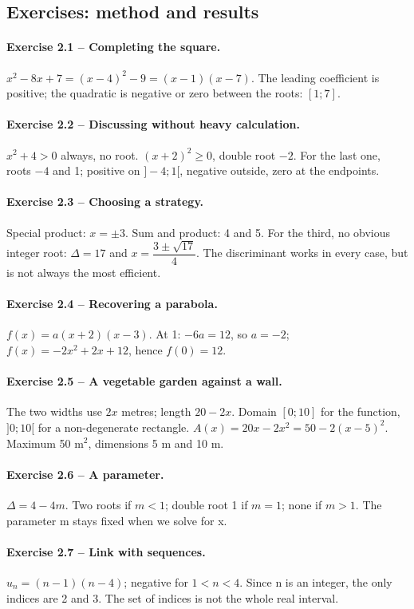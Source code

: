 \subsection*{Exercises: method and results}
\paragraph{Exercise 2.1 -- Completing the square.} $x^2-8x+7=(x-4)^2-9=(x-1)(x-7)$. The leading coefficient is positive; the quadratic is negative or zero between the roots: $[1;7]$.
\paragraph{Exercise 2.2 -- Discussing without heavy calculation.} $x^2+4>0$ always, no root. $(x+2)^2\geq0$, double root $-2$. For the last one, roots $-4$ and 1; positive on $]-4;1[$, negative outside, zero at the endpoints.
\paragraph{Exercise 2.3 -- Choosing a strategy.} Special product: $x=\pm3$. Sum and product: 4 and 5. For the third, no obvious integer root: $\Delta=17$ and $x=\dfrac{3\pm\sqrt{17}}{4}$. The discriminant works in every case, but is not always the most efficient.
\paragraph{Exercise 2.4 -- Recovering a parabola.} $f(x)=a(x+2)(x-3)$. At 1: $-6a=12$, so $a=-2$; $f(x)=-2x^2+2x+12$, hence $f(0)=12$.
\paragraph{Exercise 2.5 -- A vegetable garden against a wall.} The two widths use $2x$ metres; length $20-2x$. Domain $[0;10]$ for the function, $]0;10[$ for a non-degenerate rectangle. $A(x)=20x-2x^2=50-2(x-5)^2$. Maximum 50 m$^2$, dimensions 5 m and 10 m.
\paragraph{Exercise 2.6 -- A parameter.} $\Delta=4-4m$. Two roots if $m<1$; double root 1 if $m=1$; none if $m>1$. The parameter m stays fixed when we solve for x.
\paragraph{Exercise 2.7 -- Link with sequences.} $u_n=(n-1)(n-4)$; negative for $1<n<4$. Since n is an integer, the only indices are 2 and 3. The set of indices is not the whole real interval.
